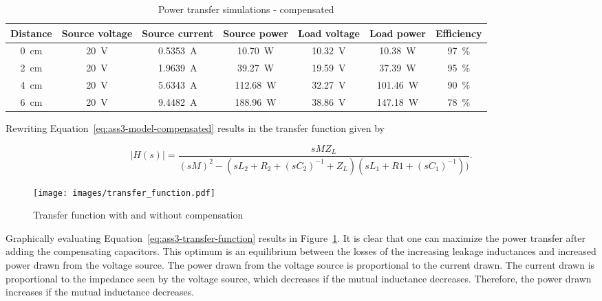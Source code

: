 \documentclass[11pt,titlepage]{report}
\begin{document}
\begin{table}[H]
	\centering
	\caption{Power transfer simulations - compensated}
	\label{tab:ass3-power-sim}
	\begin{tabular}{c c c c c c c}
		\hline\hline
		Distance & Source voltage & Source current & Source power & Load voltage & Load power & Efficiency \\
		\hline
		\SI{0}{cm} & \SI{20}{V} & \SI{0.5353}{A} & \SI{10.70}{W} & \SI{10.32}{V} & \SI{10.38}{W} & \SI{97}{\percent} \\
		\SI{2}{cm} & \SI{20}{V} & \SI{1.9639}{A} & \SI{39.27}{W} & \SI{19.59}{V} & \SI{37.39}{W} & \SI{95}{\percent} \\
		\SI{4}{cm} & \SI{20}{V} & \SI{5.6343}{A} & \SI{112.68}{W} & \SI{32.27}{V} & \SI{101.46}{W} & \SI{90}{\percent} \\
		\SI{6}{cm} & \SI{20}{V} & \SI{9.4482}{A} & \SI{188.96}{W} & \SI{38.86}{V} & \SI{147.18}{W} & \SI{78}{\percent} \\
		\hline
		\end{tabular}
\end{table}

Rewriting Equation~\ref{eq:ass3-model-compensated} results in the transfer function given by

\begin{equation} \label{eq:ass3-transfer-function}
	|H(s)| = \frac{s M Z_L}{(s M)^2 - (s L_2 + R_2 + (s C_2)^{-1} + Z_L) ( s L_1 + R1 + (s C_1)^{-1}))} .
\end{equation}

\begin{figure}[H]
	\begin{center}
		\texttt{[image: images/transfer\_function.pdf]}
	\end{center}
	\caption{Transfer function with and without compensation}
	\label{fig:ass3-transfer-function}
\end{figure}

Graphically evaluating Equation~\ref{eq:ass3-transfer-function} results in Figure~\ref{fig:ass3-transfer-function}. It is clear that one can maximize the power transfer after adding the compensating capacitors. This optimum is an equilibrium between the losses of the increasing leakage inductances and increased power drawn from the voltage source. The power drawn from the voltage source is proportional to the current drawn. The current drawn is proportional to the impedance seen by the voltage source, which decreases if the mutual inductance decreases. Therefore, the power drawn increases if the mutual inductance decreases.
\end{document}
